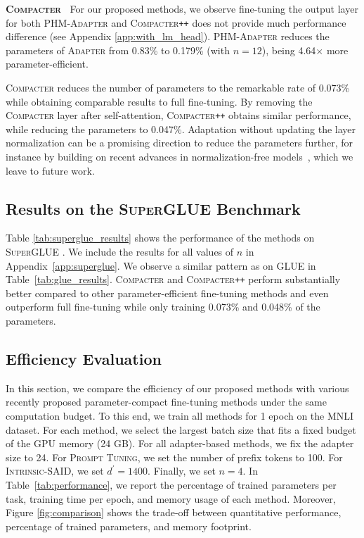  \textbf{\textsc{Compacter}} $\:$ For our proposed methods, we observe fine-tuning the output layer for both \textsc{PHM-Adapter} and \textsc{Compacter}\texttt{++} does not provide much performance difference (see Appendix \ref{app:with_lm_head}). \textsc{PHM-Adapter} reduces the parameters of \textsc{Adapter} from 0.83\% to 0.179\% (with $n=12$), being 4.64$\times$ more parameter-efficient. 

\textsc{Compacter} reduces the number of parameters to the remarkable rate of 0.073\% while obtaining comparable results to full fine-tuning. By removing the \textsc{Compacter} layer after self-attention, \textsc{Compacter}\texttt{++} obtains similar performance, while reducing the parameters to 0.047\%. Adaptation without updating the layer normalization can be a promising direction to reduce the parameters further, for instance by building on recent advances in normalization-free models~\citep{brock2021high}, which we leave to future work. 

\subsection{Results on the \textsc{SuperGLUE} Benchmark} Table \ref{tab:superglue_results} shows the performance of the methods on \textsc{SuperGLUE} \citep{wang2019superglue}. We include the results for all values of $n$ in Appendix~\ref{app:superglue}.  We observe a similar pattern as on \textsc{GLUE} in Table~\ref{tab:glue_results}. \textsc{Compacter} and \textsc{Compacter}\texttt{++} perform substantially better compared to other parameter-efficient fine-tuning methods and even outperform full fine-tuning while only training 0.073\% and 0.048\% of the parameters.

\subsection{Efficiency Evaluation} \label{sec:performance}
In this section, we compare the efficiency of our proposed methods with various recently proposed parameter-compact fine-tuning methods under the same computation budget. To this end,  we train all methods for 1 epoch on the MNLI dataset. For each method,  we select the largest batch size that fits a fixed budget of the GPU memory (24 GB). For all adapter-based methods, we fix the adapter size to 24. For \textsc{Prompt Tuning}, we set the number of prefix tokens to 100. For \textsc{Intrinsic-SAID}, we set $d^{\prime}=1400$. Finally, we set $n=4$. In Table~\ref{tab:performance}, we report the percentage of trained parameters per task, training time per epoch, and memory usage of each method. Moreover, Figure \ref{fig:comparison} shows the trade-off between quantitative performance, percentage of trained parameters, and memory footprint. 

